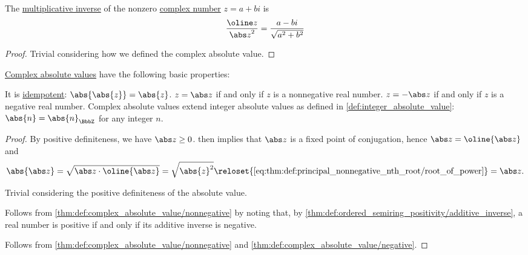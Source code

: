 \begin{proposition}\label{thm:complex_multiplicative_inverse}
  The \hyperref[def:semiring]{multiplicative inverse} of the nonzero \hyperref[def:complex_numbers]{complex number} \( z = a + bi \) is
  \begin{equation}\label{eq:thm:complex_multiplicative_inverse}
    \frac {\oline z} {{\abs z}^2} = \frac {a - bi} {\sqrt{a^2 + b^2}}
  \end{equation}
\end{proposition}
\begin{proof}
  Trivial considering how we defined the complex absolute value.
\end{proof}

\begin{proposition}\label{thm:def:complex_absolute_value}
  \hyperref[def:complex_absolute_value]{Complex absolute values} have the following basic properties:
  \begin{thmenum}
     It is \hyperref[def:idempotent_function]{idempotent}: \( \abs{\abs{z}} = \abs{z} \).
     \( z = \abs z \) if and only if \( z \) is a nonnegative real number.
     \( z = -\abs z \) if and only if \( z \) is a negative real number.
     Complex absolute values extend integer absolute values as defined in \cref{def:integer_absolute_value}: \( \abs{n} = \abs{n}_\BbbZ \) for any integer \( n \).
  \end{thmenum}
\end{proposition}
\begin{proof}
   By positive definiteness, we have \( \abs z \geq 0 \).  then implies that \( \abs z \) is a fixed point of conjugation, hence \( \abs z = \oline{\abs z} \) and
  \begin{equation*}
    \abs{\abs z}
    =
    \sqrt{ \abs z \cdot \oline{\abs z} }
    =
    \sqrt { \abs{z}^2 }
    \reloset {\eqref{eq:thm:def:principal_nonnegative_nth_root/root_of_power}} =
    \abs z.
  \end{equation*}

   Trivial considering the positive definiteness of the absolute value.

   Follows from \cref{thm:def:complex_absolute_value/nonnegative} by noting that, by \cref{thm:def:ordered_semiring_positivity/additive_inverse}, a real number is positive if and only if its additive inverse is negative.

   Follows from \cref{thm:def:complex_absolute_value/nonnegative} and \cref{thm:def:complex_absolute_value/negative}.
\end{proof}


